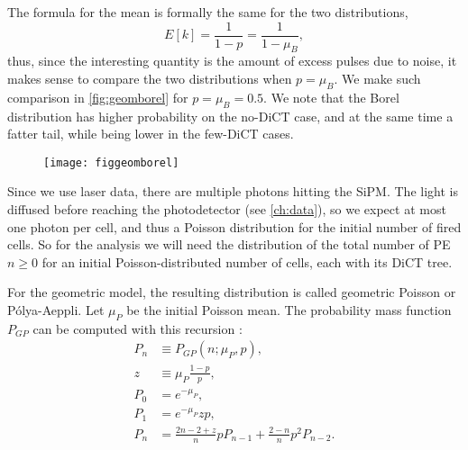 The formula for the mean is formally the same for the two distributions,
%
\begin{equation}
    E[k] = \frac 1 {1 - p} = \frac 1 {1 - \mu_B},
\end{equation}
%
thus, since the interesting quantity is the amount of excess pulses due to
noise, it makes sense to compare the two distributions when $p = \mu_B$. We
make such comparison in \autoref{fig:geomborel} for $p = \mu_B = 0.5$. We note
that the Borel distribution has higher probability on the no-DiCT case, and at
the same time a fatter tail, while being lower in the few-DiCT cases.

\begin{figure}
    
    \hspace{-0.10\textwidth}
    \texttt{[image: figgeomborel]}

    
\end{figure}

Since we use laser data, there are multiple photons hitting the SiPM. The light
is diffused before reaching the photodetector (see \autoref{ch:data}), so we
expect at most one photon per cell, and thus a Poisson distribution for the
initial number of fired cells. So for the analysis we will need the
distribution of the total number of PE $n \ge 0$ for an initial
Poisson-distributed number of cells, each with its DiCT tree.

For the geometric model, the resulting distribution is called geometric Poisson
or Pólya-Aeppli. Let $\mu_P$ be the initial Poisson mean. The probability mass
function $P_{GP}$ can be computed with this recursion \cite[5]{nuel2008}:
%
\begin{align}
    P_n &\equiv P_{GP}(n;\mu_P,p), \\
    z &\equiv \mu_P \frac{1-p}p, \\
    P_0 &= e^{-\mu_P}, \\
    P_1 &= e^{-\mu_P} zp, \\
    P_n &= \frac{2n - 2 + z}n p P_{n-1} + \frac{2-n}n p^2 P_{n-2}.
    \label{eq:geompoisson}
\end{align}

